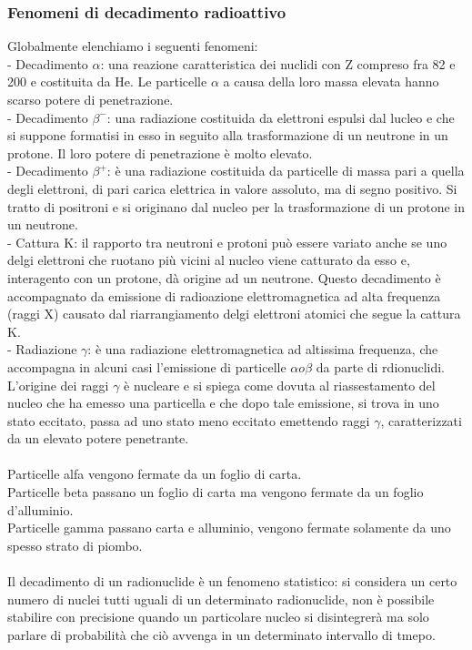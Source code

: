 \subsubsection{Fenomeni di decadimento radioattivo}
Globalmente elenchiamo i seguenti fenomeni:\\
\tab- Decadimento $\alpha$: una reazione caratteristica dei nuclidi con Z compreso fra 82 e 200 e costituita da He. Le particelle $\alpha$ a causa della loro massa elevata hanno scarso potere di penetrazione.\\
\tab- Decadimento $\beta^-$: una radiazione costituida da elettroni espulsi dal lucleo e che si suppone formatisi in esso in seguito alla trasformazione di un neutrone in un protone. Il loro potere di penetrazione è molto elevato.\\
\tab- Decadimento $\beta^+$: è una radiazione costituida da particelle di massa pari a quella degli elettroni, di pari carica elettrica in valore assoluto, ma di segno positivo. Si tratto di positroni e si originano dal nucleo per la trasformazione di un protone in un neutrone.\\
\tab- Cattura K: il rapporto tra neutroni e protoni può essere variato anche se uno delgi elettroni che ruotano più vicini al nucleo viene catturato da esso e, interagento con un protone, dà origine ad un neutrone. Questo decadimento è accompagnato da emissione di radioazione elettromagnetica ad alta frequenza (raggi X) causato dal riarrangiamento delgi elettroni atomici che segue la cattura K.\\
\tab- Radiazione $\gamma$: è una radiazione elettromagnetica ad altissima frequenza, che accompagna in alcuni casi l'emissione di particelle $\alpha o \beta$ da parte di rdionuclidi. L'origine dei raggi $\gamma$ è nucleare e si spiega come dovuta al riassestamento del nucleo che ha emesso una particella e che dopo tale emissione, si trova in uno stato eccitato, passa ad uno stato meno eccitato emettendo raggi $\gamma$, caratterizzati da un elevato potere penetrante.\\\\
Particelle alfa vengono fermate da un foglio di carta.\\
Particelle beta passano un foglio di carta ma vengono fermate da un foglio d'alluminio.\\
Particelle gamma passano carta e alluminio, vengono fermate solamente da uno spesso strato di piombo.\\\\
Il decadimento di un radionuclide è un fenomeno statistico: si considera un certo numero di nuclei tutti uguali di un determinato radionuclide, non è possibile stabilire con precisione quando un particolare nucleo si disintegrerà ma solo parlare di probabilità che ciò avvenga in un determinato intervallo di tmepo.\\
